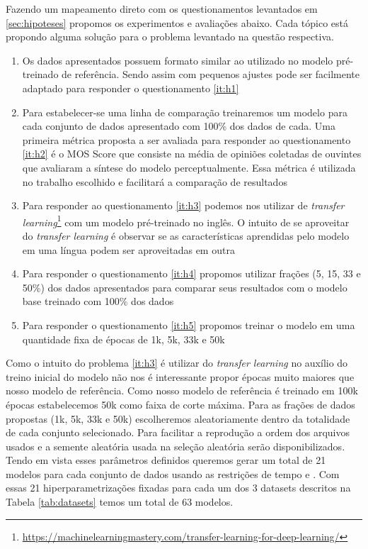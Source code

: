 \documentclass{article}
\begin{document}
Fazendo um mapeamento direto com os questionamentos levantados em \ref{sec:hipoteses} propomos os experimentos e avaliações abaixo.
Cada tópico está propondo alguma solução para o problema levantado na questão respectiva. 
\begin{enumerate}
	\item Os dados apresentados possuem formato similar ao utilizado no modelo pré-treinado de referência. 
	Sendo assim com pequenos ajustes pode ser facilmente adaptado para responder o questionamento \ref{it:h1}
	\item Para estabelecer-se uma linha de comparação treinaremos um modelo para cada conjunto de dados apresentado com 100\% dos dados de cada.
	Uma primeira métrica proposta a ser avaliada para responder ao questionamento \ref{it:h2} é o MOS Score que consiste na média de opiniões coletadas de ouvintes que avaliaram a síntese do modelo perceptualmente.
	Essa métrica é utilizada no trabalho escolhido e facilitará a comparação de resultados
	\item Para responder ao questionamento \ref{it:h3} podemos nos utilizar de \textit{transfer learning}\footnote{\url{https://machinelearningmastery.com/transfer-learning-for-deep-learning/}} com um modelo pré-treinado no inglês.
	O intuito de se aproveitar do \textit{transfer learning} é observar se as características aprendidas pelo modelo em uma língua podem ser aproveitadas em outra
	\item Para responder o questionamento \ref{it:h4} propomos utilizar frações (5, 15, 33 e 50\%) dos dados apresentados para comparar seus resultados com o modelo base treinado com 100\% dos dados
	\item Para responder o questionamento \ref{it:h5} propomos treinar o modelo em uma quantidade fixa de épocas de 1k, 5k, 33k e 50k
\end{enumerate}

Como o intuito do problema \ref{it:h3} é utilizar do \textit{transfer learning} no auxílio do treino inicial do modelo não nos é interessante propor épocas muito maiores que nosso modelo de referência. 
Como nosso modelo de referência é treinado em 100k épocas estabelecemos 50k como faixa de corte máxima. 
Para as frações de dados propostas (1k, 5k, 33k e 50k) escolheremos aleatoriamente dentro da totalidade de cada conjunto selecionado.
Para facilitar a reprodução a ordem dos arquivos usados e a semente aleatória usada na seleção aleatória serão disponibilizados.
Tendo em vista esses parâmetros definidos queremos gerar um total de 21 modelos para cada conjunto de dados usando as restrições de tempo e .
Com essas 21 hiperparametrizações fixadas para cada um dos 3 datasets descritos na Tabela \ref{tab:datasets} temos um total de 63 modelos. 
\end{document}
